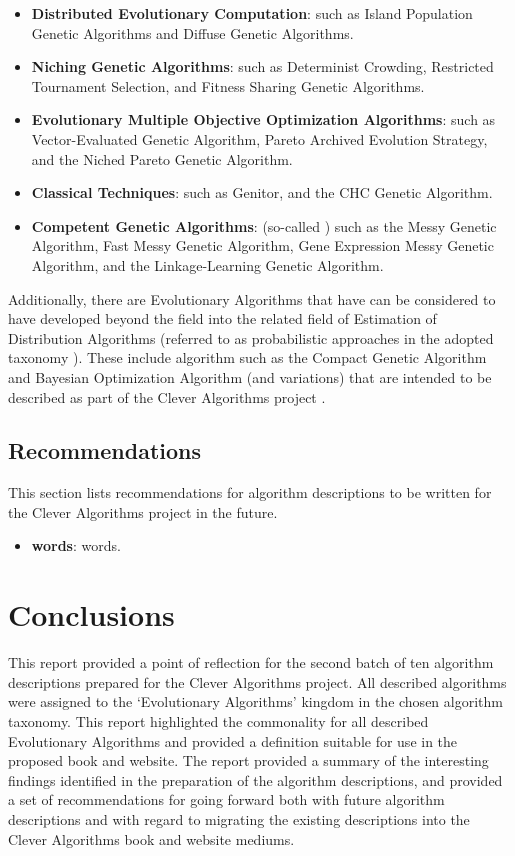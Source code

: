 \documentclass[a4paper, 11pt]{article}
\begin{document}
\begin{itemize}
	\item \textbf{Distributed Evolutionary Computation}: such as Island Population Genetic Algorithms and Diffuse Genetic Algorithms.
	\item \textbf{Niching Genetic Algorithms}: such as Determinist Crowding, Restricted Tournament Selection, and Fitness Sharing Genetic Algorithms.
	\item \textbf{Evolutionary Multiple Objective Optimization Algorithms}: such as Vector-Evaluated Genetic Algorithm, Pareto Archived Evolution Strategy, and the Niched Pareto Genetic Algorithm.
	\item \textbf{Classical Techniques}: such as Genitor, and the CHC Genetic Algorithm.
	\item \textbf{Competent Genetic Algorithms}: (so-called \cite{Goldberg2002}) such as the Messy Genetic Algorithm, Fast Messy Genetic Algorithm, Gene Expression Messy Genetic Algorithm, and the Linkage-Learning Genetic Algorithm.
\end{itemize}

Additionally, there are Evolutionary Algorithms that have can be considered to have developed beyond the field into the related field of Estimation of Distribution Algorithms (referred to as probabilistic approaches in the adopted taxonomy \cite{Brownlee2010b}). These include algorithm such as the Compact Genetic Algorithm and Bayesian Optimization Algorithm (and variations) that are intended to be described as part of the Clever Algorithms project \cite{Brownlee2010b}.

% 
% 
\subsection{Recommendations}
This section lists recommendations for algorithm descriptions to be written for the Clever Algorithms project in the future. 

\begin{itemize}
	\item \textbf{words}: words.
\end{itemize}

% 
% 
\section{Conclusions}
\label{sec:conclusions}
This report provided a point of reflection for the second batch of ten algorithm descriptions prepared for the Clever Algorithms project. All described algorithms were assigned to the `Evolutionary Algorithms' kingdom in the chosen algorithm taxonomy. This report highlighted the commonality for all described Evolutionary Algorithms and provided a definition suitable for use in the proposed book and website.
The report provided a summary of the interesting findings identified in the preparation of the algorithm descriptions, and provided a set of recommendations for going forward both with future algorithm descriptions and with regard to migrating the existing descriptions into the Clever Algorithms book and website mediums.



\end{document}
